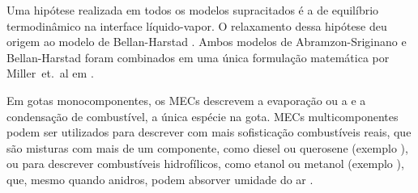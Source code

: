 Uma hipótese realizada em todos os modelos supracitados é a de equilíbrio termodinâmico na interface líquido-vapor.
O relaxamento dessa hipótese deu origem ao modelo de Bellan-Harstad \cite{BellanJ1987}.
Ambos modelos de Abramzon-Sriginano e Bellan-Harstad foram combinados em uma única formulação matemática por Miller~et.~al em \cite{MillerR1998}.


Em gotas monocomponentes, os MECs descrevem a evaporação ou a e a condensação de combustível, a única espécie na gota.
MECs multicomponentes podem ser utilizados para descrever com mais sofisticação combustíveis reais, que são misturas com mais de um componente, como diesel ou querosene (exemplo \cite{FriedrichD2022,ShastryV2021,ShastryV2023,SekularacN2024}), ou para descrever combustíveis hidrofílicos, como etanol ou metanol (exemplo \cite{BojkoDesJardin2017CF,SacomanoF2024CF,SacomanoF2025CF,MaquaC2008,ZanuttoC2019,ChenL2016IJHMT}), que, mesmo quando anidros, podem absorver umidade do ar \cite{SacomanoF2024CF,SacomanoF2025CF}. 

